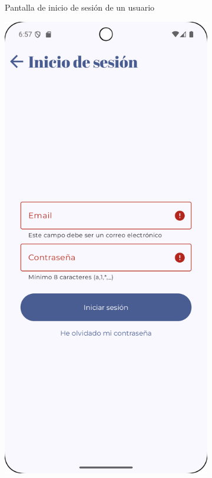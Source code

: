 \begin{figure}[H]
\begin{subfigure}[b]{0.3\textwidth}
      \caption{Pantalla de inicio de sesión de un usuario}
      \label{fig:login}
    \end{subfigure}
    \hfill
    \begin{subfigure}[b]{0.3\textwidth}
      \includegraphics[width=\textwidth]{./img/manual/login_empty_fields.png}

\end{subfigure}
\end{figure}
